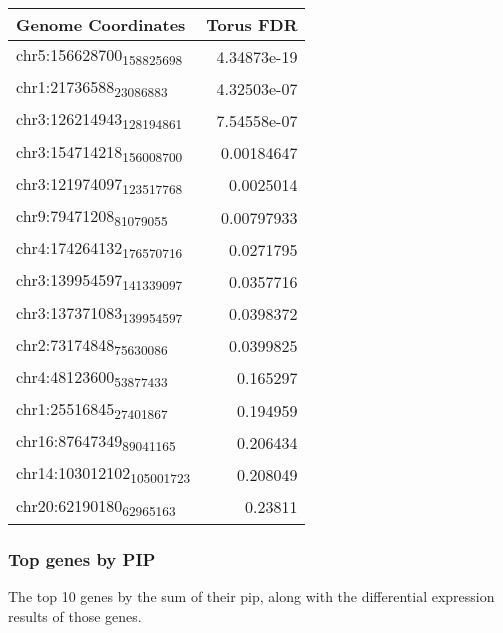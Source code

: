 \begin{center}
\begin{tabular}{lr}
Genome Coordinates & Torus FDR\\
\hline
chr5:156628700\textsubscript{158825698} & 4.34873e-19\\
chr1:21736588\textsubscript{23086883} & 4.32503e-07\\
chr3:126214943\textsubscript{128194861} & 7.54558e-07\\
chr3:154714218\textsubscript{156008700} & 0.00184647\\
chr3:121974097\textsubscript{123517768} & 0.0025014\\
chr9:79471208\textsubscript{81079055} & 0.00797933\\
chr4:174264132\textsubscript{176570716} & 0.0271795\\
chr3:139954597\textsubscript{141339097} & 0.0357716\\
chr3:137371083\textsubscript{139954597} & 0.0398372\\
chr2:73174848\textsubscript{75630086} & 0.0399825\\
chr4:48123600\textsubscript{53877433} & 0.165297\\
chr1:25516845\textsubscript{27401867} & 0.194959\\
chr16:87647349\textsubscript{89041165} & 0.206434\\
chr14:103012102\textsubscript{105001723} & 0.208049\\
chr20:62190180\textsubscript{62965163} & 0.23811\\
\end{tabular}
\end{center}




\subsubsection{Top genes by PIP}\label{sec:org28d8484}

The top 10 genes by the sum of their pip, along with the differential expression results of those genes.


